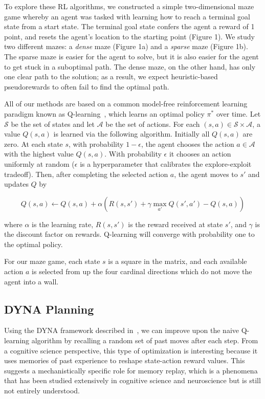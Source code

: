 \documentclass[notitlepage]{article}
\begin{document}
To explore these RL algorithms, we constructed a simple two-dimensional maze game whereby an agent was tasked with learning how to reach a terminal goal state from a start state. The terminal goal state confers the agent a reward of 1 point, and resets the agent's location to the starting point (Figure 1). We study two different mazes: a \textit{dense} maze (Figure 1a) and a \textit{sparse} maze (Figure 1b). The sparse maze is easier for the agent to solve, but it is also easier for the agent to get stuck in a suboptimal path. The dense maze, on the other hand, has only one clear path to the solution; as a result, we expect heuristic-based pseudorewards to often fail to find the optimal path.

All of our methods are based on a common model-free reinforcement learning paradigm known as Q-learning~\cite{sutton1998reinforcement}, which learns an optimal policy $\pi^*$ over time. Let $\mathcal{S}$ be the set of states and let $\mathcal{A}$ be the set of actions. For each $(s,a) \in \mathcal{S} \times \mathcal{A}$, a value $Q(s,a)$ is learned via the following algorithm. Initially all $Q(s,a)$ are zero. At each state $s$, with probability $1 - \epsilon$, the agent chooses the action $a \in \mathcal{A}$ with the highest value $Q(s,a)$. With probability $\epsilon$ it chooses an action uniformly at random ($\epsilon$ is a hyperparameter that calibrates the explore-exploit tradeoff). Then, after completing the selected action $a$, the agent moves to $s'$ and updates $Q$ by

\begin{equation}
Q(s,a) \leftarrow Q(s,a) + \alpha (R(s, s') + \gamma \max_{a'} Q(s', a') - Q(s,a))
\label{eq:q-learn}
\end{equation}

where $\alpha$ is the learning rate, $R(s, s')$ is the reward received at state $s'$, and $\gamma$ is the discount factor on rewards. Q-learning will converge with probability one to the optimal policy. 

For our maze game, each state $s$ is a square in the matrix, and each available action $a$ is selected from up the four cardinal directions which do not move the agent into a wall. 

\subsection*{DYNA Planning}

Using the DYNA framework described in~\cite{sutton1998reinforcement}, we can improve upon the naive Q-learning algorithm by recalling a random set of past moves after each step. From a cognitive science perspective, this type of optimization is interesting because it uses memories of past experience to reshape state-action reward values. This suggests a mechanistically specific role for memory replay, which is a phenomena that has been studied extensively in cognitive science and neuroscience but is still not entirely understood.
\end{document}
